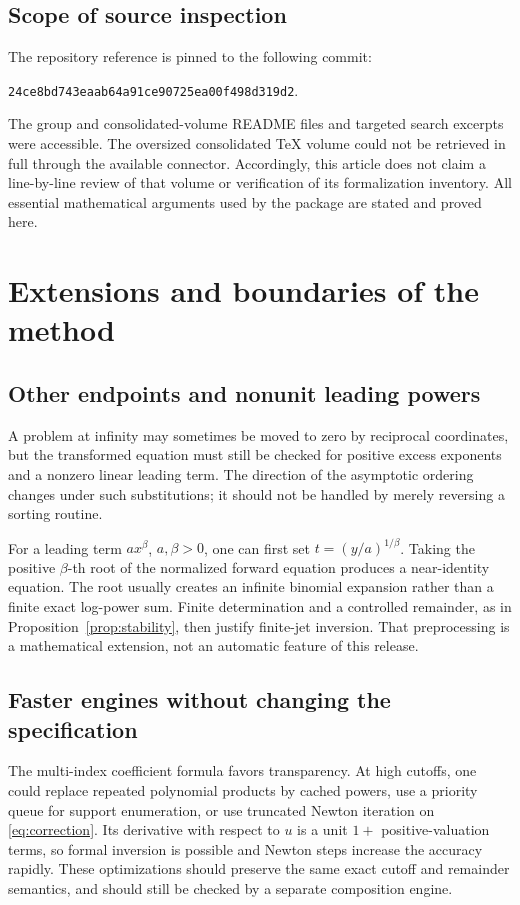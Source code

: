 \documentclass[11pt,a4paper]{article}
\theoremstyle{definition}
\begin{document}
\subsection*{Scope of source inspection}
The repository reference is pinned to the following commit:
\begin{center}
\texttt{24ce8bd743eaab64a91ce90725ea00f498d319d2}.
\end{center}
The group and consolidated-volume
README files and targeted search excerpts were accessible. The oversized
consolidated \TeX{} volume could not be retrieved in full through the available
connector. Accordingly, this article does not claim a line-by-line review of
that volume or verification of its formalization inventory. All essential
mathematical arguments used by the package are stated and proved here.

\section{Extensions and boundaries of the method}
\subsection{Other endpoints and nonunit leading powers}
A problem at infinity may sometimes be moved to zero by reciprocal
coordinates, but the transformed equation must still be checked for positive
excess exponents and a nonzero linear leading term. The direction of the
asymptotic ordering changes under such substitutions; it should not be
handled by merely reversing a sorting routine.

For a leading term \(a x^\beta\), \(a,\beta>0\), one can first set
\(t=(y/a)^{1/\beta}\). Taking the positive \(\beta\)-th root of the normalized
forward equation produces a near-identity equation. The root usually creates
an infinite binomial expansion rather than a finite exact log-power sum.
Finite determination and a controlled remainder, as in
Proposition~\ref{prop:stability}, then justify finite-jet inversion. That
preprocessing is a mathematical extension, not an automatic feature of this
release.

\subsection{Faster engines without changing the specification}
The multi-index coefficient formula favors transparency. At high cutoffs,
one could replace repeated polynomial products by cached powers, use a
priority queue for support enumeration, or use truncated Newton iteration on
\eqref{eq:correction}. Its derivative with respect to \(u\) is a unit
\(1+\) positive-valuation terms, so formal inversion is possible and Newton
steps increase the accuracy rapidly. These optimizations should preserve the
same exact cutoff and remainder semantics, and should still be checked by a
separate composition engine.
\end{document}
